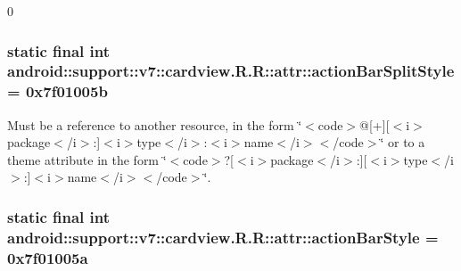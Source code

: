 0\hypertarget{classandroid_1_1support_1_1v7_1_1cardview_1_1_r_1_1attr_0cb887b1dd764449ab6c253433e77f5b}{
\subsubsection[{actionBarSplitStyle}]{\setlength{\rightskip}{0pt plus 5cm}static final int android::support::v7::cardview.R.R::attr::actionBarSplitStyle = 0x7f01005b}}
\label{classandroid_1_1support_1_1v7_1_1cardview_1_1_r_1_1attr_0cb887b1dd764449ab6c253433e77f5b}


Must be a reference to another resource, in the form \char`\"{}$<$code$>$@\mbox{[}+\mbox{]}\mbox{[}$<$i$>$package$<$/i$>$:\mbox{]}$<$i$>$type$<$/i$>$:$<$i$>$name$<$/i$>$$<$/code$>$\char`\"{} or to a theme attribute in the form \char`\"{}$<$code$>$?\mbox{[}$<$i$>$package$<$/i$>$:\mbox{]}\mbox{[}$<$i$>$type$<$/i$>$:\mbox{]}$<$i$>$name$<$/i$>$$<$/code$>$\char`\"{}. \hypertarget{classandroid_1_1support_1_1v7_1_1cardview_1_1_r_1_1attr_412d3eb379cb8f1913e985a3781b2265}{
\subsubsection[{actionBarStyle}]{\setlength{\rightskip}{0pt plus 5cm}static final int android::support::v7::cardview.R.R::attr::actionBarStyle = 0x7f01005a}}
\label{classandroid_1_1support_1_1v7_1_1cardview_1_1_r_1_1attr_412d3eb379cb8f1913e985a3781b2265}


